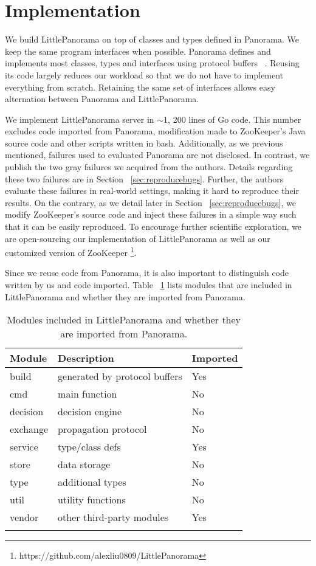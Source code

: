 \section{Implementation}
We build LittlePanorama on top of classes and types defined in Panorama. We keep the same program interfaces when possible. Panorama defines and implements most classes, types and interfaces using protocol buffers ~\cite{Protocol27:online}. Reusing its code largely reduces our workload so that we do not have to implement everything from scratch. Retaining the same set of interfaces allows easy alternation between Panorama and LittlePanorama. 

We implement LittlePanorama server in $\sim$1, 200 lines of Go code. This number excludes code imported from Panorama, modification made to ZooKeeper's Java source code and other scripts written in bash. Additionally, as we previous mentioned, failures used to evaluated Panorama are not disclosed. In contrast, we publish the two gray failures we acquired from the authors. Details regarding these two failures are in Section ~\ref{sec:reproducebugs}. Further, the authors evaluate these failures in real-world settings, making it hard to reproduce their results. On the contrary, as we detail later in Section ~\ref{sec:reproducebugs}, we modify ZooKeeper's source code and inject these failures in a simple way such that it can be easily reproduced. To encourage further scientific exploration, we are open-sourcing our implementation of LittlePanorama as well as our customized version of ZooKeeper \footnote{https://github.com/alexliu0809/LittlePanorama}.

Since we reuse code from Panorama, it is also important to distinguish code written by us and code imported. Table ~\ref{tab:implementation} lists modules that are included in LittlePanorama and whether they are imported from Panorama.
\begin{table}[!tb]
\begin{tabular}{p{}p{}p{}}%

\toprule
    \textbf{Module} & \textbf{Description} & \textbf{Imported} \\
\midrule
      build & generated by protocol buffers & Yes \\
      cmd & main function & No \\
      decision & decision engine & No \\
      exchange & propagation protocol  & No \\
      service & type/class defs & Yes \\
      store & data storage & No \\
      type & additional types & No \\
      util & utility functions & No \\
      vendor & other third-party modules & Yes \\
\bottomrule
\vspace{0.5em}
\end{tabular}
\caption{Modules included in LittlePanorama and whether they are imported from Panorama.}
\label{tab:implementation}
\end{table}